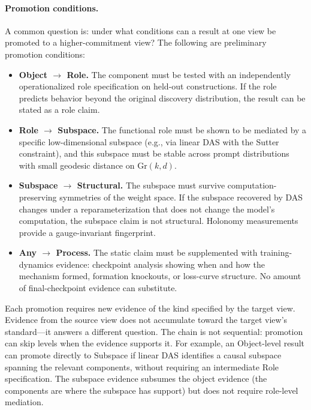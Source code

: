 \documentclass[11pt]{article}
\theoremstyle{remark}
\newcommand{\Gr}{\mathrm{Gr}}
\begin{document}
\paragraph{Promotion conditions.}
A common question is: under what conditions can a result at one view be
promoted to a higher-commitment view?  The following are preliminary
promotion conditions:
\begin{itemize}[leftmargin=*]
\item \textbf{Object $\to$ Role.}  The component must be tested with an
      independently operationalized role specification on held-out
      constructions.  If the role predicts behavior beyond the original
      discovery distribution, the result can be stated as a role claim.
\item \textbf{Role $\to$ Subspace.}  The functional role must be shown to
      be mediated by a specific low-dimensional subspace (e.g., via linear
      DAS with the Sutter constraint), and this subspace must be stable
      across prompt distributions with small geodesic distance on $\Gr(k,d)$.
\item \textbf{Subspace $\to$ Structural.}  The subspace must survive
      computation-preserving symmetries of the weight space.  If the subspace
      recovered by DAS changes under a reparameterization that does not
      change the model's computation, the subspace claim is not structural.
      Holonomy measurements provide a gauge-invariant fingerprint.
\item \textbf{Any $\to$ Process.}  The static claim must be supplemented
      with training-dynamics evidence: checkpoint analysis showing when and
      how the mechanism formed, formation knockouts, or loss-curve structure.
      No amount of final-checkpoint evidence can substitute.
\end{itemize}
Each promotion requires new evidence of the kind specified by the target
view.  Evidence from the source view does not accumulate toward the
target view's standard---it answers a different question.  The chain is
not sequential: promotion can skip levels when the evidence supports it.
For example, an Object-level result can promote directly to Subspace if
linear DAS identifies a causal subspace spanning the relevant components,
without requiring an intermediate Role specification.  The subspace
evidence subsumes the object evidence (the components are where the
subspace has support) but does not require role-level mediation.
\end{document}
